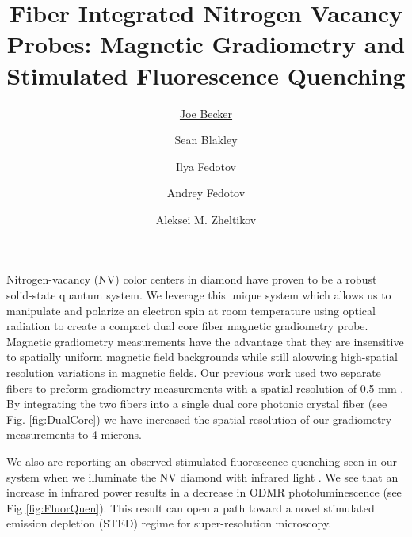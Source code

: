 \documentclass[12 pt]{article}
\begin{document}
\title{\vspace{-1.5cm}\textbf{Fiber Integrated Nitrogen Vacancy Probes: Magnetic Gradiometry and Stimulated Fluorescence Quenching}}

\date{}

\author{\underline{Joe Becker}}
\author{Sean Blakley}
\author[1,2,3]{Ilya Fedotov}
\author[1,2,3]{Andrey Fedotov}
\author[1,2,3]{Aleksei M. Zheltikov}

\begin{small}
\end{small}

\maketitle

\thispagestyle{empty}
\vspace{-1cm}
Nitrogen-vacancy (NV) color centers in diamond have proven to be a robust solid-state quantum system. We leverage 
this unique system which allows us to manipulate and polarize an electron spin at room temperature using optical 
radiation to create a compact dual core fiber magnetic gradiometry probe. Magnetic gradiometry measurements have
the advantage that they are insensitive to spatially uniform magnetic field backgrounds 
while still alowwing high-spatial resolution variations in magnetic fields. Our previous work used two separate fibers 
to preform gradiometry measurements with a spatial resolution of 0.5 mm \cite{Blakley2015}. By integrating the 
two fibers into a single dual core photonic crystal fiber (see Fig. \ref{fig:DualCore}) we have increased the spatial resolution of our gradiometry 
measurements to 4 microns.


We also are reporting an observed stimulated fluorescence quenching seen in our system when we illuminate the NV
diamond with infrared light \cite{Blakley2016}. We see that an increase in infrared power results in a decrease in
ODMR photoluminescence (see Fig \ref{fig:FluorQuen}). This result can open a path toward a novel stimulated emission 
depletion (STED) regime for super-resolution microscopy.
\end{document}
